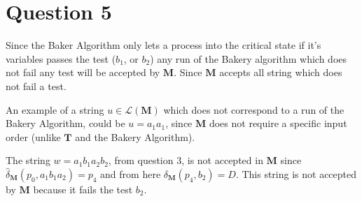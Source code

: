 \section*{Question 5}

Since the Baker Algorithm only lets a process into the critical state if it's variables passes the test ($b_1$, or $b_2$) any run of the Bakery algorithm which does not fail any test will be accepted by $\mathbf{M}$. Since $\mathbf{M}$ accepts all string which does not fail a test. 

An example of a string $u \in \mathcal{L} (\mathbf{M})$ which does not correspond to a run of the Bakery Algorithm, could be $u = a_1a_1$, since $\mathbf{M}$ does not require a specific input order (unlike $\mathbf{T}$ and the Bakery Algorithm). 

The string $w = a_1b_1a_2b_2$, from question 3, is not accepted in $\mathbf{M}$ since $\hat{\delta}_{\mathbf{M}}(p_0, a_1b_1a_2) = p_4$ and from here $\delta_\mathbf{M}(p_4, b_2) = D$. This string is not accepted by $\mathbf{M}$ because it fails the test $b_2$. 